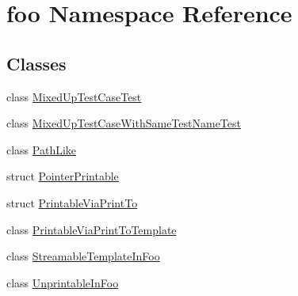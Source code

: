 \hypertarget{namespacefoo}{}\section{foo Namespace Reference}
\label{namespacefoo}
\subsection*{Classes}
\begin{DoxyCompactItemize}
\item 
class \mbox{\hyperlink{classfoo_1_1MixedUpTestCaseTest}{Mixed\+Up\+Test\+Case\+Test}}
\item 
class \mbox{\hyperlink{classfoo_1_1MixedUpTestCaseWithSameTestNameTest}{Mixed\+Up\+Test\+Case\+With\+Same\+Test\+Name\+Test}}
\item 
class \mbox{\hyperlink{classfoo_1_1PathLike}{Path\+Like}}
\item 
struct \mbox{\hyperlink{structfoo_1_1PointerPrintable}{Pointer\+Printable}}
\item 
struct \mbox{\hyperlink{structfoo_1_1PrintableViaPrintTo}{Printable\+Via\+Print\+To}}
\item 
class \mbox{\hyperlink{classfoo_1_1PrintableViaPrintToTemplate}{Printable\+Via\+Print\+To\+Template}}
\item 
class \mbox{\hyperlink{classfoo_1_1StreamableTemplateInFoo}{Streamable\+Template\+In\+Foo}}
\item 
class \mbox{\hyperlink{classfoo_1_1UnprintableInFoo}{Unprintable\+In\+Foo}}
\end{DoxyCompactItemize}

